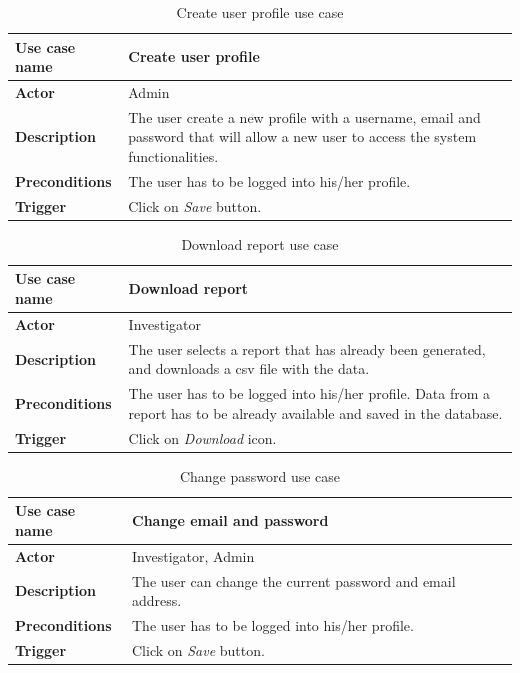 \begin{table}[H]
\centering
\begin{tabular}{l p{9cm}}  
\toprule
\bf{Use case name}    & Create user profile \\
\midrule
\bf{Actor}    & Admin \\
\midrule
\bf{Description}    & The user create a new profile with a username, email and
password that will allow a new user to access the system functionalities.
\\
\midrule
\bf{Preconditions}    & The user has to be logged into his/her profile. \\
\midrule
\bf{Trigger}    & Click on \emph{Save} button. \\
\bottomrule
\end{tabular}
\caption{Create user profile use case}
\end{table}

\begin{table}[H]
\centering
\begin{tabular}{l p{9cm}}  
\toprule
\bf{Use case name}    & Download report \\
\midrule
\bf{Actor}    & Investigator \\
\midrule
\bf{Description}    & The user selects a report that has already been
generated, and downloads a csv file with the data.
\\
\midrule
\bf{Preconditions}    & The user has to be logged into his/her profile. Data
from a report has to be already available and saved in the database.
\\
\midrule
\bf{Trigger}    & Click on \emph{Download} icon. \\
\bottomrule
\end{tabular}
\caption{Download report use case}
\end{table}

\begin{table}[H]
\centering
\begin{tabular}{l p{9cm}}  
\toprule
\bf{Use case name}    & Change email and password \\
\midrule
\bf{Actor}    & Investigator, Admin \\
\midrule
\bf{Description}    & The user can change the current password and email
address.
\\
\midrule
\bf{Preconditions}    & The user has to be logged into his/her profile.
\\
\midrule
\bf{Trigger}    & Click on \emph{Save} button. \\
\bottomrule
\end{tabular}
\caption{Change password use case}
\end{table}

